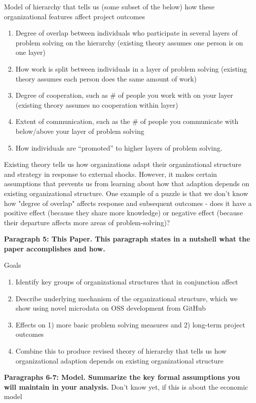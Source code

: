 \documentclass[source/paper/main.tex]{subfiles}
\begin{document}
Model of hierarchy that tells us (some subset of the below) how these organizational features affect project outcomes
\begin{enumerate}
    \item Degree of overlap between individuals who participate in several layers of problem solving on the hierarchy (existing theory assumes one person is on one layer)
    \item How work is split between individuals in a layer of problem solving (existing theory assumes each person does the same amount of work)
    \item Degree of cooperation, such as \# of people you work with on your layer (existing theory assumes no cooperation within layer)
    \item Extent of communication, such as the \# of people you communicate with below/above your layer of problem solving
    \item How individuals are “promoted” to higher layers of problem solving.
\end{enumerate}
Existing theory tells us how organizations adapt their organizational structure and strategy in response to external shocks. However, it makes certain assumptions that prevents us from learning about how that adaption depends on existing organizational structure. One example of a puzzle is that we don't know how "degree of overlap" affects response and subsequent outcomes - does it have a positive effect (because they share more knowledge) or negative effect (because their departure affects more areas of problem-solving)?

\textbf{Paragraph 5: This Paper. This paragraph states in a nutshell what the paper accomplishes and how. }

Goals
\begin{enumerate}
    \item Identify key groups of organizational structures that in conjunction affect 
    \item Describe underlying mechanism of the organizational structure, which we show using novel microdata on OSS development from GitHub
    \item Effects on 1) more basic problem solving measures and 2) long-term project outcomes
    \item Combine this to produce revised theory of hierarchy that tells us how organizational adaption depends on existing organizational structure 
\end{enumerate}


\textbf{Paragraphs 6-7: Model. Summarize the key formal assumptions you will maintain in your analysis.}
Don't know yet, if this is about the economic model
\end{document}
